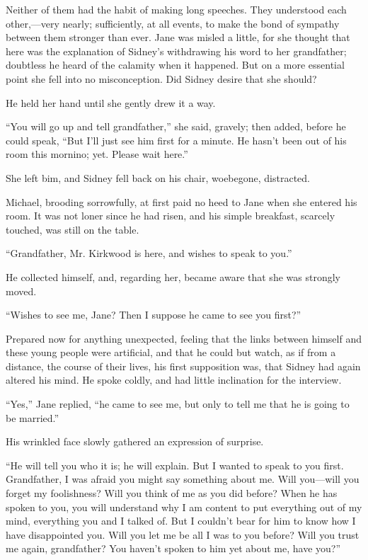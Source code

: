 Neither of them had the habit of making long speeches. They understood
each other,---very nearly; sufficiently, at all events, to make the bond
of sympathy between them stronger than ever. Jane was misled a little,
for she thought that here was the explanation of Sidney's withdrawing
his word to her grandfather; doubtless he heard of the calamity when it
happened. But on a more essential point she fell into no misconception.
Did Sidney desire that she should?

He held her hand until she gently drew it a way.

``You will go up and tell grandfather,'' she said, gravely; then added,
before he could speak, ``But I'll just see him first for a minute. He
hasn't been out of his room this mornino; yet. Please wait here.''

{\protect\hypertarget{152}{}{}}She left bim, and Sidney fell back on his
chair, woebegone, distracted.

Michael, brooding sorrowfully, at first paid no heed to Jane when she
entered his room. It was not loner since he had risen, and his simple
breakfast, scarcely touched, was still on the table.

``Grandfather, Mr. Kirkwood is here, and wishes to speak to you.''

He collected himself, and, regarding her, became aware that she was
strongly moved.

``Wishes to see me, Jane? Then I suppose he came to see you first?''

Prepared now for anything unexpected, feeling that the links between
himself and these young people were artificial, and that he could but
watch, as if from a distance, the course of their lives, his first
supposition was, that Sidney had again altered his mind. He spoke
coldly, and had little inclination for the interview.

``Yes,'' Jane replied, ``he came to see me, but only to tell me that he
is going to be married.''

His wrinkled face slowly gathered an expression of surprise.

``He will tell you who it is; he will explain.
{\protect\hypertarget{153}{}{}}But I wanted to speak to you first.
Grandfather, I was afraid you might say something about me. Will
you---will you forget my foolishness? Will you think of me as you did
before? When he has spoken to you, you will understand why I am content
to put everything out of my mind, everything you and I talked of. But I
couldn't bear for him to know how I have disappointed you. Will you let
me be all I was to you before? Will you trust me again, grandfather? You
haven't spoken to him yet about me, have you?''

